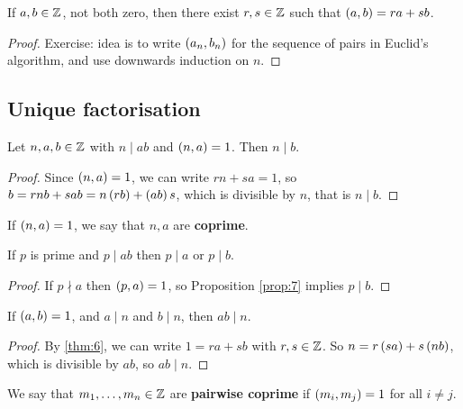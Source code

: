 \begin{theorem}
\label{thm:6}
If $ a, b \in \mathbb{Z} $, not both zero, then there exist $ r, s \in \mathbb{Z} $ such that $ \left( a, b \right) = ra + sb $.
\end{theorem}

\begin{proof}
Exercise: idea is to write $ \left( a_n, b_n \right) $ for the sequence of pairs in Euclid's algorithm, and use downwards induction on $ n $.
\end{proof}

\subsection{Unique factorisation}

\begin{proposition}
\label{prop:7}
Let $ n, a, b \in \mathbb{Z} $ with $ n \mid ab $ and $ \left( n, a \right) = 1 $. Then $ n \mid b $.
\end{proposition}

\begin{proof}
Since $ \left( n, a \right) = 1 $, we can write $ rn + sa = 1 $, so $ b = rnb + sab = n\left( rb \right) + \left( ab \right)s $, which is divisible by $ n $, that is $ n \mid b $.
\end{proof}

If $ \left( n, a \right) = 1 $, we say that $ n, a $ are \textbf{coprime}.


\begin{corollary}
\label{cor:8}
If $ p $ is prime and $ p \mid ab $ then $ p \mid a $ or $ p \mid b $.
\end{corollary}

\begin{proof}
If $ p \nmid a $ then $ \left( p, a \right) = 1 $, so Proposition \ref{prop:7} implies $ p \mid b $.
\end{proof}

\begin{proposition}
\label{prop:9}
If $ \left( a, b \right) = 1 $, and $ a \mid n $ and $ b \mid n $, then $ ab \mid n $.
\end{proposition}

\begin{proof}
By \ref{thm:6}, we can write $ 1 = ra + sb $ with $ r, s \in \mathbb{Z} $. So $ n = r\left( sa \right) + s\left( nb \right) $, which is divisible by $ ab $, so $ ab \mid n $.
\end{proof}

We say that $ m_1, \dots, m_n \in \mathbb{Z} $ are \textbf{pairwise coprime} if $ \left( m_i, m_j \right) = 1 $ for all $ i \ne j $.

